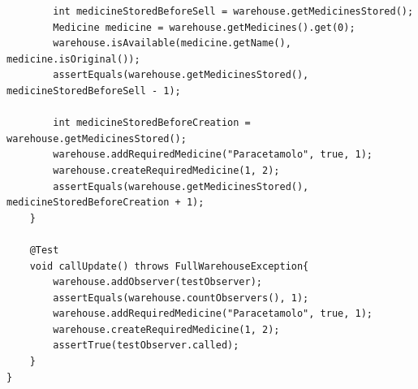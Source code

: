 \documentclass[a4paper, 10pt]{report}
\begin{document}
\begin{lstlisting}
        int medicineStoredBeforeSell = warehouse.getMedicinesStored();
        Medicine medicine = warehouse.getMedicines().get(0);
        warehouse.isAvailable(medicine.getName(), medicine.isOriginal());
        assertEquals(warehouse.getMedicinesStored(), medicineStoredBeforeSell - 1);

        int medicineStoredBeforeCreation = warehouse.getMedicinesStored();
        warehouse.addRequiredMedicine("Paracetamolo", true, 1);
        warehouse.createRequiredMedicine(1, 2);
        assertEquals(warehouse.getMedicinesStored(), medicineStoredBeforeCreation + 1);
    }

    @Test
    void callUpdate() throws FullWarehouseException{
        warehouse.addObserver(testObserver);
        assertEquals(warehouse.countObservers(), 1);
        warehouse.addRequiredMedicine("Paracetamolo", true, 1);
        warehouse.createRequiredMedicine(1, 2);
        assertTrue(testObserver.called);
    }
}
\end{lstlisting}
\end{document}
